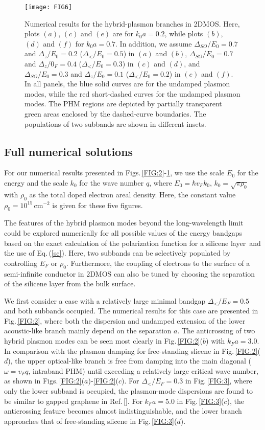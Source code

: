 \documentclass[aps,prb,showpacs]{revtex4}
\begin{document}
\begin{figure}
\centering
\texttt{[image: FIG6]}
\caption{Numerical results for the hybrid-plasmon branches in 2DMOS. Here, plots $(a)$, $(c)$ and $(e)$ are for 
$k_0a = 0.2$, while plots $(b)$, $(d)$ and $(f)$ for $k_0a = 0.7$.
In addition, we assume $\Delta_{SO}/E_0=0.7$ and $\Delta_{z}/E_0=0.2$ ($\Delta_</E_0=0.5$) in $(a)$ and $(b)$, 
$\Delta_{SO}/E_0=0.7$ and $\Delta_{z}/0_F=0.4$ ($\Delta_</E_0=0.3$) in $(c)$ and $(d)$,
and $\Delta_{SO}/E_0=0.3$ and $\Delta_{z}/E_0=0.1$ ($\Delta_</E_0=0.2$) in $(e)$ and $(f)$.
In all panels, the blue solid curves are for the undamped plasmon modes, while the red short-dashed curves for the undamped plasmon modes. 
The PHM regions are depicted by partially transparent green areas enclosed by the dashed-curve boundaries.  
The populations of two subbands are shown in different insets.}
\label{FIG:6}
\end{figure}

\subsection{Full numerical solutions}

For our numerical results presented in Figs.\,\ref{FIG:2}-\ref{FIG:6}, we use the scale $E_0$ for the energy and the scale $k_0$ for the wave number $q$, where $E_0=\hbar v_Fk_0$,
$k_0=\sqrt{\pi\rho_0}$ with $\rho_0$ as the total doped electron areal density. Here, the constant value $\rho_0=10^{15}\,$cm$^{-2}$ is given for these five figures.
\medskip

The features of the hybrid plasmon modes beyond the long-wavelength limit could be explored numerically 
for all possible values of the energy bandgaps based on the exact calculation of the polarization function for a silicene layer\,\cite{SilMain} 
and the use of Eq.\,(\ref{sc}). Here, two subbands can be selectively populated by controlling $E_F$ or $\rho_0$. Furthermore, the coupling of electrons to the surface of a semi-infinite conductor in 2DMOS can 
also be tuned by choosing the separation of the silicene layer from the bulk surface. 
\medskip

We first consider a case with a relatively large minimal bandgap $\Delta_</E_F = 0.5$ and both subbands occupied. The numerical results for this case  
are presented in Fig.\,\ref{FIG:2}, where both the dispersion and undamped extension of the lower acoustic-like branch mainly
depend on the separation $a$. The anticrossing of two hybrid plasmon modes can be seen most clearly in Fig.\,\ref{FIG:2}($b$) with $k_Fa=3.0$.
In comparison with the plasmon damping for free-standing slicene in Fig.\,\ref{FIG:2}($d$), 
the upper optical-like branch is free from damping into the main diagonal ($\omega = v_F q$, intraband PHM) until exceeding a relatively large critical wave number, as shown in Figs.\,\ref{FIG:2}($a$)-\ref{FIG:2}($c$).
For $\Delta_</E_F = 0.3$ in Fig.\,\ref{FIG:3}, where only the lower subband is occupied, the plasmon-mode dispersions
are found to be similar to gapped graphene in Ref.\,[]. For $k_Fa=5.0$ in Fig.\,\ref{FIG:3}($c$), 
the anticrossing feature becomes almost indistinguishable, and the lower branch approaches that of free-standing slicene in Fig.\,\ref{FIG:3}($d$). 
\medskip
\end{document}
